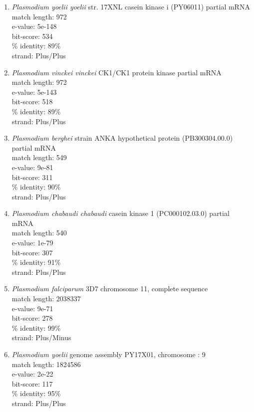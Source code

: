 \documentclass{acm_proc_article-sp}
\begin{document}
\begin{enumerate}
 \item \textit{Plasmodium yoelii yoelii} str. 17XNL casein kinase i (PY06011) partial mRNA \\
  match length: 972 \\
 e-value: 5e-148 \\
 bit-score: 534 \\
 \% identity: 89\% \\
 strand: Plus/Plus \\
 
 \item \textit{Plasmodium vinckei vinckei} CK1/CK1 protein kinase partial mRNA \\
  match length: 972 \\
 e-value: 5e-143 \\
 bit-score: 518 \\
 \% identity: 89\%\\
 strand: Plus/Plus \\
 
 \item \textit{Plasmodium berghei} strain ANKA hypothetical protein (PB300304.00.0) partial mRNA \\ 
  match length: 549 \\
 e-value: 9e-81 \\
 bit-score: 311 \\
 \% identity: 90\% \\
 strand: Plus/Plus \\
 
 \item \textit{Plasmodium chabaudi chabaudi} casein kinase 1 (PC000102.03.0) partial mRNA \\
  match length: 540 \\
 e-value: 1e-79 \\
 bit-score: 307 \\
 \% identity: 91\% \\
 strand: Plus/Plus \\
 
 \item \textit{Plasmodium falciparum} 3D7 chromosome 11, complete sequence \\
  match length: 2038337 \\
 e-value: 9e-71 \\
 bit-score: 278 \\
 \% identity: 99\% \\
 strand: Plus/Minus \\
 
 \item \textit{Plasmodium yoelii} genome assembly PY17X01, chromosome : 9 \\
  match length: 1824586 \\
 e-value: 2e-22 \\
 bit-score: 117 \\
 \% identity: 95\% \\
 strand: Plus/Plus \\
 
\end{enumerate}
\end{document}
